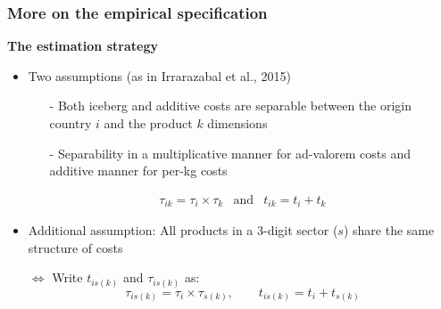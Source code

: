 \documentclass[10 pt,Helvetica, french]{beamer}
\begin{document}
\begin{frame}[label = app_empirical_strategy]
\frametitle{More on the empirical specification }
\textbf{The estimation strategy}
\begin{itemize}
\item Two assumptions (as in Irrarazabal et al., 2015) \vspace{0.1cm}
\begin{itemize}
\item[-] Both iceberg and additive costs are separable between the origin country $i$ and the product $k$ dimensions \vspace{0.1cm}
\item[-] Separability in a multiplicative manner for ad-valorem costs and additive manner for per-kg costs \vspace{0.1cm}
\end{itemize}
\footnotesize
\begin{eqnarray*}
\tau_{ik} = \tau_i \times \tau_k &\text{and}& t_{ik} = t_i + t_k
\end{eqnarray*}
\normalsize
\item Additional assumption: All products in a 3-digit sector ($s$) share the same structure of costs \vspace{0.1cm}
\item[$\Leftrightarrow$] Write $t_{is(k)}$ and $\tau_{is(k)}$ as:
\footnotesize
\begin{equation}
 \tau_{is(k)} = \tau_{i} \times \tau_{s(k)}, \qquad t_{is(k)} = t_{i} + t_{s(k)} \label{eq:specifTC}
 \end{equation}
 \normalsize
\end{itemize}
\end{frame}
\end{document}
